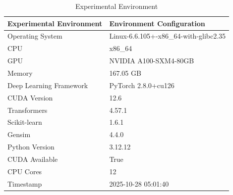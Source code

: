 \begin{table}
\caption{Experimental Environment}
\label{tab:env}
\begin{tabular}{ll}
\toprule
Experimental Environment & Environment Configuration \\
\midrule
Operating System & Linux-6.6.105+-x86_64-with-glibc2.35 \\
CPU & x86_64 \\
GPU & NVIDIA A100-SXM4-80GB \\
Memory & 167.05 GB \\
Deep Learning Framework & PyTorch 2.8.0+cu126 \\
CUDA Version & 12.6 \\
Transformers & 4.57.1 \\
Scikit-learn & 1.6.1 \\
Gensim & 4.4.0 \\
Python Version & 3.12.12 \\
CUDA Available & True \\
CPU Cores & 12 \\
Timestamp & 2025-10-28 05:01:40 \\
\bottomrule
\end{tabular}
\end{table}
